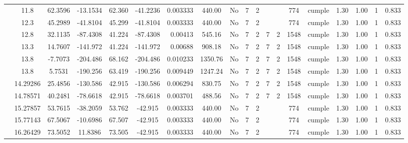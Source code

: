\begin{table}[H]
{\begin{tabular}{|c|c|c|c|c|c|r|c|c|c|c|c|c|c|c|c|c|c|c|}
\cline{2-19}        & 11.8 & 62.3596 & -13.1534 & 62.360 & -41.2236 & 0.003333 & 440.00 & No  & 7   & 2   &     &     & 774 & \cellcolor[rgb]{ .776,  .937,  .808}cumple & 1.30 & 1.00 & 1   & 0.833 \bigstrut\\
\cline{2-19}        & 12.3 & 45.2989 & -41.8104 & 45.299 & -41.8104 & 0.003333 & 440.00 & No  & 7   & 2   &     &     & 774 & \cellcolor[rgb]{ .776,  .937,  .808}cumple & 1.30 & 1.00 & 1   & 0.833 \bigstrut\\
\cline{2-19}        & 12.8 & 32.1135 & -87.4308 & 41.224 & -87.4308 & 0.00413 & 545.16 & No  & 7   & 2   & 7   & 2   & 1548 & \cellcolor[rgb]{ .776,  .937,  .808}cumple & 1.30 & 1.00 & 1   & 0.833 \bigstrut\\
\cline{2-19}        & 13.3 & 14.7607 & -141.972 & 41.224 & -141.972 & 0.00688 & 908.18 & No  & 7   & 2   & 7   & 2   & 1548 & \cellcolor[rgb]{ .776,  .937,  .808}cumple & 1.30 & 1.00 & 1   & 0.833 \bigstrut\\
\cline{2-19}        & \cellcolor[rgb]{ .851,  .882,  .949}13.8 & -7.7073 & -204.486 & 68.162 & -204.486 & 0.010233 & 1350.76 & No  & 7   & 2   & 7   & 2   & 1548 & \cellcolor[rgb]{ .776,  .937,  .808}cumple & 1.30 & 1.00 & 1   & 0.833 \bigstrut\\
\cline{2-19}        & \cellcolor[rgb]{ .851,  .882,  .949}13.8 & 5.7531 & -190.256 & 63.419 & -190.256 & 0.009449 & 1247.24 & No  & 7   & 2   & 7   & 2   & 1548 & \cellcolor[rgb]{ .776,  .937,  .808}cumple & 1.30 & 1.00 & 1   & 0.833 \bigstrut\\
\cline{2-19}        & 14.29286 & 25.4856 & -130.586 & 42.915 & -130.586 & 0.006294 & 830.75 & No  & 7   & 2   & 7   & 2   & 1548 & \cellcolor[rgb]{ .776,  .937,  .808}cumple & 1.30 & 1.00 & 1   & 0.833 \bigstrut\\
\cline{2-19}        & 14.78571 & 40.2481 & -78.6618 & 42.915 & -78.6618 & 0.003701 & 488.56 & No  & 7   & 2   & 7   & 2   & 1548 & \cellcolor[rgb]{ .776,  .937,  .808}cumple & 1.30 & 1.00 & 1   & 0.833 \bigstrut\\
\cline{2-19}        & 15.27857 & 53.7615 & -38.2059 & 53.762 & -42.915 & 0.003333 & 440.00 & No  & 7   & 2   &     &     & 774 & \cellcolor[rgb]{ .776,  .937,  .808}cumple & 1.30 & 1.00 & 1   & 0.833 \bigstrut\\
\cline{2-19}        & 15.77143 & 67.5067 & -10.6986 & 67.507 & -42.915 & 0.003333 & 440.00 & No  & 7   & 2   &     &     & 774 & \cellcolor[rgb]{ .776,  .937,  .808}cumple & 1.30 & 1.00 & 1   & 0.833 \bigstrut\\
\cline{2-19}        & 16.26429 & 73.5052 & 11.8386 & 73.505 & -42.915 & 0.003333 & 440.00 & No  & 7   & 2   &     &     & 774 & \cellcolor[rgb]{ .776,  .937,  .808}cumple & 1.30 & 1.00 & 1   & 0.833 \bigstrut\\

\end{tabular}}
\end{table}
